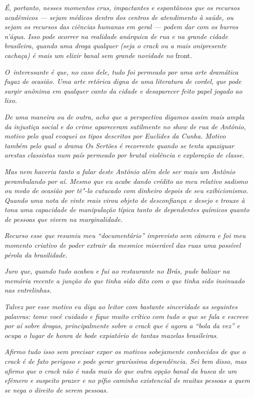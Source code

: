 \emph{É, portanto, nesses momentos crus, impactantes e espontâneos que
os recursos acadêmicos --- sejam médicos dentro dos centros de
atendimento à saúde, ou sejam os recursos das ciências humanas em geral
--- podem dar com os burros n'água. Isso pode ocorrer na realidade
anárquica de rua e na grande cidade brasileira, quando uma droga
qualquer (seja o crack ou a mais onipresente cachaça) é mais um elixir
banal sem grande novidade no} front.

\emph{O~interessante é que, no caso dele, tudo foi permeado por uma arte
dramática fugaz de ocasião. Uma arte retórica digna de uma literatura de
cordel, que pode surgir anônima em qualquer canto da cidade e
desaparecer feito papel jogado ao lixo.}

\emph{De uma maneira ou de outra, acho que a perspectiva digamos assim
mais ampla da injustiça social e do crime apareceram sutilmente no show
de rua de Antônio, motivo pelo qual evoquei os tipos descritos por
Euclides da Cunha. Motivo também pelo qual o drama Os Sertões é
recorrente quando se tenta apaziguar arestas classistas num país
permeado por brutal violência e exploração de classe.}

\emph{Mas nem haveria tanto a falar deste Antônio além dele ser mais um
Antônio perambulando por aí. Mesmo que eu acabe dando crédito ao meu
relativo sadismo ou medo de ocasião por tê"-lo cutucado com dinheiro
depois de seu exibicionismo. Quando uma nota de vinte reais virou objeto
de desconfiança e desejo e trouxe à tona uma capacidade de manipulação
típica tanto de dependentes químicos quanto de pessoas que vivem na
marginalidade.}

\emph{Recurso esse que resumiu meu ``documentário'' imprevisto sem
câmera e foi meu momento criativo de poder extrair da mesmice miserável
das ruas uma possível pérola da brasilidade.}

\emph{Juro que, quando tudo acabou e fui ao restaurante no Brás, pude
balizar na memória recente a junção do que tinha sido dito com o que
tinha sido insinuado nas entrelinhas.}

\emph{Talvez por esse motivo eu diga ao leitor com bastante sinceridade
as seguintes palavras: tome você cuidado e fique muito crítico com tudo
o que se fala e escreve por aí sobre drogas, principalmente sobre o
crack que é agora a ``bola da vez'' e ocupa o lugar de honra de bode
expiatório de tantas mazelas brasileiras.}

\emph{Afirmo tudo isso sem precisar expor os motivos sobejamente
conhecidos de que o crack é de fato perigoso e pode gerar gravíssima
dependência. Sei bem disso, mas afirmo que o crack não é nada mais do
que outra opção banal da busca de um efêmero e suspeito prazer e no
pífio caminho existencial de muitas pessoas a quem se nega o direito de
serem pessoas.}

